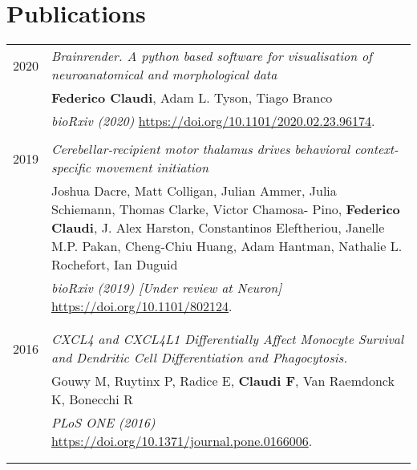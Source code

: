 \documentclass[a4paper,10pt]{article}
\begin{document}
\section{Publications}
\begin{tabular}{r|p{13cm}}

    2020 & \textit{Brainrender. A python based software for visualisation of neuroanatomical and morphological data} \\&
        \textbf{Federico Claudi}, Adam L. Tyson, Tiago Branco \\&
        \textit{bioRxiv (2020)} \url{https://doi.org/10.1101/2020.02.23.96174}.  
        \\\multicolumn{2}{c}{} \\
 
    2019 & \textit{Cerebellar-recipient motor thalamus drives behavioral context-specific movement initiation} \\&
        Joshua Dacre, Matt Colligan, Julian Ammer, Julia Schiemann, Thomas Clarke, Victor Chamosa-
        Pino, \textbf{Federico Claudi}, J. Alex Harston, Constantinos Eleftheriou, Janelle M.P. Pakan, Cheng-Chiu
        Huang, Adam Hantman, Nathalie L. Rochefort, Ian Duguid \\&
        \textit{bioRxiv (2019) [Under review at Neuron]} \url{https://doi.org/10.1101/802124}.  \\&
        
        \\\multicolumn{2}{c}{} \\
        
    2016 & \textit{CXCL4 and CXCL4L1 Differentially Affect Monocyte Survival and Dendritic Cell Differentiation and Phagocytosis.} \\&
        Gouwy M, Ruytinx P, Radice E, \textbf{Claudi F}, Van Raemdonck K, Bonecchi R \\&
        \textit{PLoS ONE (2016)} \url{https://doi.org/10.1371/journal.pone.0166006}.  \\&
        \\\multicolumn{2}{c}{} \\
\end{tabular}

\end{document}
